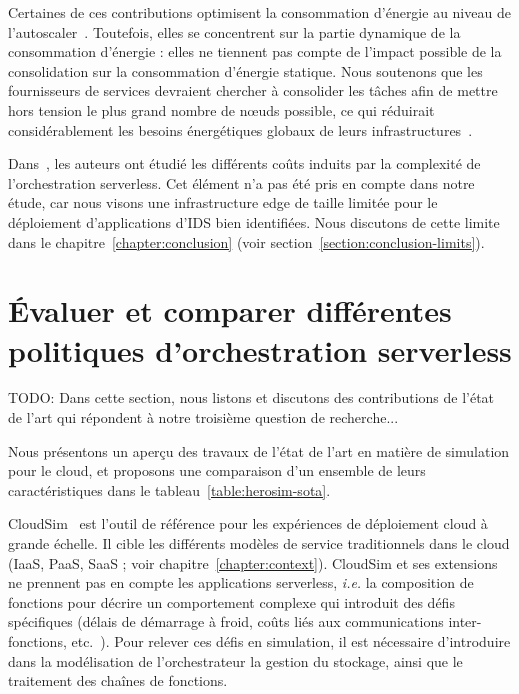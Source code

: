 Certaines de ces contributions optimisent la consommation d'énergie au niveau de l'autoscaler~\cite{bhasiCypressInputSizesensitive2022, zhangFIRSTExploitingMultiDimensional2023}. Toutefois, elles se concentrent sur la partie dynamique de la consommation d'énergie : elles ne tiennent pas compte de l'impact possible de la consolidation sur la consommation d'énergie statique. Nous soutenons que les fournisseurs de services devraient chercher à consolider les tâches afin de mettre hors tension le plus grand nombre de nœuds possible, ce qui réduirait considérablement les besoins énergétiques globaux de leurs infrastructures~\cite{leeEnergyEfficientUtilization2012}.

Dans~\cite{fuerstIluvatarFastControl2023}, les auteurs ont étudié les différents coûts induits par la complexité de l'orchestration serverless. Cet élément n'a pas été pris en compte dans notre étude, car nous visons une infrastructure edge de taille limitée pour le déploiement d'applications d'\gls{IDS} bien identifiées. Nous discutons de cette limite dans le chapitre~\ref{chapter:conclusion} (voir section~\ref{section:conclusion-limits}).

\section{Évaluer et comparer différentes politiques d'orchestration serverless}
\label{section:sota-herosim}

TODO: Dans cette section, nous listons et discutons des contributions de l'état de l'art qui répondent à notre troisième question de recherche...


Nous présentons un aperçu des travaux de l'état de l'art en matière de simulation pour le cloud, et proposons une comparaison d'un ensemble de leurs caractéristiques dans le tableau~\ref{table:herosim-sota}.

CloudSim~\cite{calheiros_cloudsim_2011} est l'outil de référence pour les expériences de déploiement cloud à grande échelle. Il cible les différents modèles de service traditionnels dans le cloud (\gls{IaaS}, \gls{PaaS}, \gls{SaaS} ; voir chapitre~\ref{chapter:context}).
CloudSim et ses extensions~\cite{calheiros_cloudsim_2011, mampage_cloudsimsc_2023, wickremasinghe_cloudanalyst_2010, jeonCloudSimExtensionSimulatingDistributed2019} ne prennent pas en compte les applications serverless, \textit{i.e.} la composition de fonctions pour décrire un comportement complexe qui introduit des défis spécifiques (délais de démarrage à froid, coûts liés aux communications inter-fonctions, etc.~\cite{wawrzoniakBoxerDataAnalytics2021a}).
Pour relever ces défis en simulation, il est nécessaire d'introduire dans la modélisation de l'orchestrateur la gestion du stockage, ainsi que le traitement des chaînes de fonctions.

